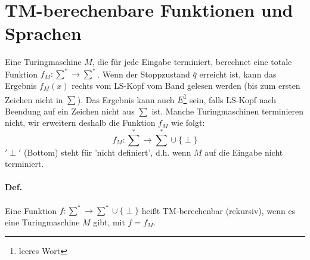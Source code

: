 
\section{TM-berechenbare Funktionen und Sprachen}
Eine Turingmaschine $M$, die für jede Eingabe terminiert, berechnet eine totale Funktion $f_M:\sum^* \rightarrow \sum^*$. Wenn der Stoppzustand $\overline{q}$ erreicht ist, kann das Ergebnis $f_M(x)$ rechts vom LS-Kopf vom Band gelesen werden (bis zum ersten Zeichen nicht in $\sum$). Das Ergebnis kann auch $E$\footnote{leeres Wort} sein, falls LS-Kopf nach Beendung auf ein Zeichen nicht aus $\sum$ ist. Manche Turingmaschinen terminieren nicht, wir erweitern deshalb die Funktion $f_M$ wie folgt: $$ f_M:\sum\limits^* \rightarrow \sum\limits^* \cup \{ \perp \} $$ $'\perp'$ (Bottom) steht für 'nicht definiert', d.h. wenn $M$ auf die Eingabe nicht terminiert.

\paragraph*{Def.} Eine Funktion $f:\sum\limits^* \rightarrow \sum\limits^* \cup \{ \perp \}$ heißt TM-berechenbar (rekursiv), wenn es eine Turingmaschine $M$ gibt, mit $f=f_M$.
